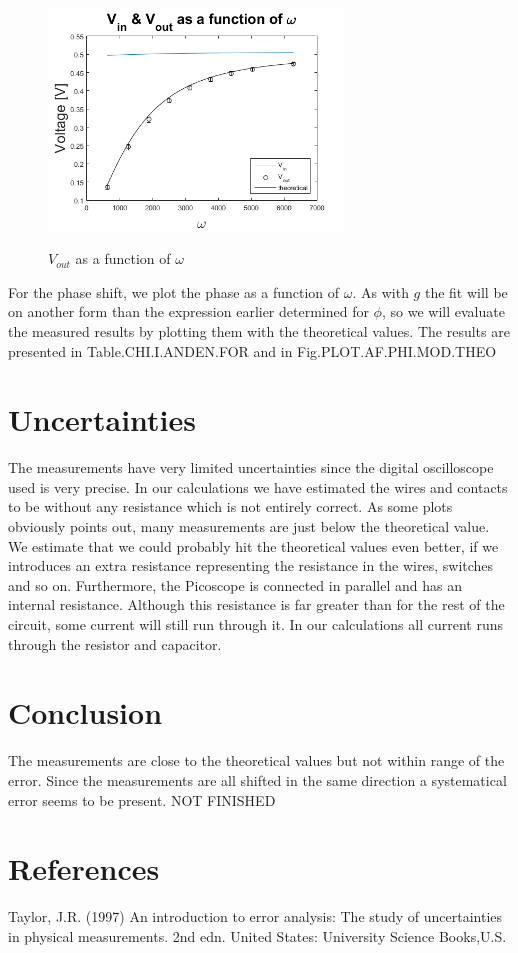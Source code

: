 \documentclass[../main/main.tex]{subfiles}
\begin{document}
\begin{figure}[!ht]
  \caption{ \( V_{out} \) as a function of \( \omega \) }
  \centering
    \includegraphics[width=0.7\textwidth]{../img/VinVudafphi.png}
    \label{fig:VinVudafphi}
\end{figure}

For the phase shift, we plot the phase as a function of \( \omega \).
As with \( g \) the fit will be on another form than the expression earlier determined for \( \phi \), so we will evaluate the measured results by plotting them with the theoretical values.
The results are presented in Table.CHI.I.ANDEN.FOR and in Fig.PLOT.AF.PHI.MOD.THEO

\section{Uncertainties}

The measurements have very limited uncertainties since the digital oscilloscope used is very precise.
In our calculations we have estimated the wires and contacts to be without any resistance which is not entirely correct.
As some plots obviously points out, many measurements are just below the theoretical value.
We estimate that we could probably hit the theoretical values even better, if we introduces an extra resistance representing the resistance in the wires, switches and so on.
Furthermore, the Picoscope is connected in parallel and has an internal resistance.
Although this resistance is far greater than for the rest of the circuit, some current will still run through it.
In our calculations all current runs through the resistor and capacitor.

\section{Conclusion}

The measurements are close to the theoretical values but not within range of the error.
Since the measurements are all shifted in the same direction a systematical error seems to be present.
NOT FINISHED

\section{References}

Taylor, J.R. (1997) An introduction to error analysis: The study of uncertainties in physical measurements. 2nd edn. United States: University Science Books,U.S.
\end{document}

